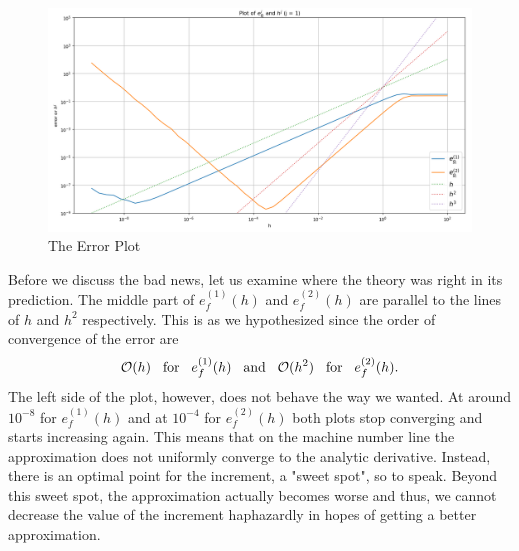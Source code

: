 \begin{figure}[h!]
    \includegraphics[width=\linewidth]{graphics/error_plot/exp1_error_plot.png}
    \caption{The Error Plot}
    \label{fig:exp1_error_plot}
\end{figure}

Before we discuss the bad news, let us examine where the theory was right in its prediction. The middle part of \(e_f^{(1)}(h)\) and \(e_f^{(2)}(h)\) are parallel to the lines of \(h\) and \(h^2\) respectively. This is as we hypothesized since the order of convergence of the error are
\[\mathcal{O}(h) \hspace{0.3cm} \text{for} \hspace{0.3cm} e_f^{(1)}(h) \hspace{0.3cm} \text{and} \hspace{0.3cm} \mathcal{O}(h^2) \hspace{0.3cm} \text{for} \hspace{0.3cm} e_f^{(2)}(h) \text{.}\]
The left side of the plot, however, does not behave the way we wanted. At around \(10^{-8}\) for \(e_f^{(1)}(h)\) and at \(10^{-4}\) for \(e_f^{(2)}(h)\) both plots stop converging and starts increasing again. This means that on the machine number line the approximation does not uniformly converge to the analytic derivative. Instead, there is an optimal point for the increment, a "sweet spot", so to speak. Beyond this sweet spot, the approximation actually becomes worse and thus, we cannot decrease the value of the increment haphazardly in hopes of getting a better approximation.

